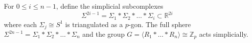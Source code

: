 For $0 \leq i \leq n-1$, define the simplicial subcomplexes
$$\Sigma^{2i-1} = \Sigma_1 * \Sigma_2 * \dots * \Sigma_i \subset \mathbb{R}^{2i}$$
where each $\Sigma_j \cong S^1$ is triangulated as a $p$-gon. The full sphere $\Sigma^{2n-1} = \Sigma_1 * \Sigma_2 * \dots * \Sigma_n$ and the group $G = \langle R_1 * \dots * R_n \rangle \cong \mathbb{Z}_p$ acts simplicially.
